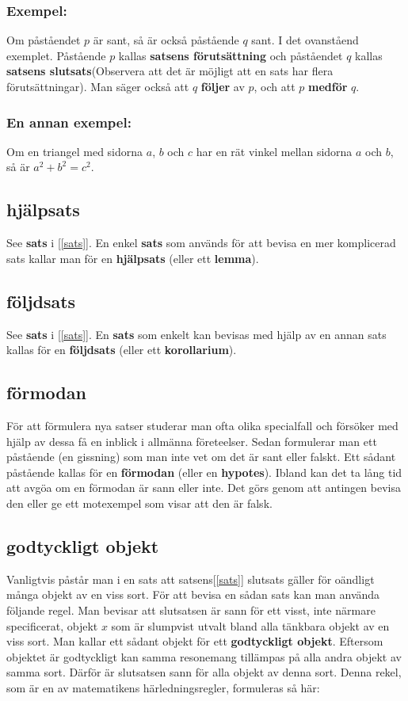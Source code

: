     \subsubsection{Exempel:}
        Om påståendet $p$ är sant, så är också påstående $q$ sant.
    \newline \hfill \break I det ovanståend exemplet. Påstående $p$ kallas \textbf{satsens förutsättning} och påståendet $q$ kallas \textbf{satsens slutsats}(Observera att det är möjligt att en sats har flera förutsättningar). Man säger också att $q$ \textbf{följer} av $p$, och att $p$ \textbf{medför} $q$.
    \subsubsection{En annan exempel:}
        Om en triangel med sidorna $a$, $b$ och $c$ har en rät vinkel mellan sidorna $a$ och $b$, så är $a^2+b^2=c^2$.
\subsection{\textbf{hjälpsats}}\label{hjälpsats}
    See \textbf{sats} i [\ref{sats}]. En enkel \textbf{sats} som används för att bevisa en mer komplicerad sats kallar man för en \textbf{hjälpsats} (eller ett \textbf{lemma}).
\subsection{\textbf{följdsats}}\label{följdsats}
    See \textbf{sats} i [\ref{sats}]. En \textbf{sats} som enkelt kan bevisas med hjälp av en annan sats kallas för en \textbf{följdsats} (eller ett \textbf{korollarium}).
\subsection{\textbf{förmodan}}\label{förmodan}
    \textbf{\cite{förmodan}} För att förmulera nya satser studerar man ofta olika specialfall och försöker med hjälp av dessa få en inblick i allmänna företeelser. Sedan formulerar man ett påstående (en gissning) som man inte vet om det är sant eller falskt. Ett sådant påstående kallas för en \textbf{förmodan} (eller en \textbf{hypotes}). Ibland kan det ta lång tid att avgöa om en förmodan är sann eller inte. Det görs genom att antingen bevisa den eller ge ett motexempel som visar att den är falsk.
\subsection{\textbf{godtyckligt objekt}}\label{godtyckligt-objekt}
    \textbf{\cite{godtyckligt-objekt}} Vanligtvis påstår man i en sats att satsens[\ref{sats}] slutsats gäller för oändligt många objekt av en viss sort. För att bevisa en sådan sats kan man använda följande regel. Man bevisar att slutsatsen är sann för ett visst, inte närmare specificerat, objekt $x$ som är slumpvist utvalt bland alla tänkbara objekt av en viss sort. Man kallar ett sådant objekt för ett \textbf{godtyckligt objekt}. Eftersom objektet är godtyckligt kan samma resonemang tillämpas på alla andra objekt av samma sort. Därför är slutsatsen sann för alla objekt av denna sort. Denna rekel, som är en av matematikens härledningsregler, formuleras så här: 
